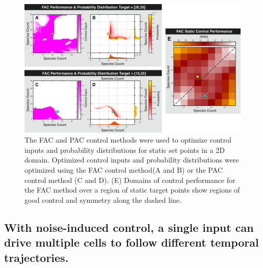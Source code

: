 \documentclass[12pt]{iopart}
\begin{document}
\begin{figure}
\begin{center}
\includegraphics[width=1\textwidth]{StaticControl.pdf}
\vspace{-0.1in}
\caption{The FAC and PAC control methods were used to optimize control inputs and probability distributions for static set points in a 2D domain.  Optimized control inputs and probability distributions were optimized using the FAC control method(A and B) or the PAC control method (C and D). (E) Domains of control performance for the FAC method over a region of static target points show regions of good control and symmetry along the dashed line.} 
\label{CtrlP}
\end{center}
\vspace{-0.2in}
\end{figure}

\subsection{With noise-induced control, a single input can drive multiple cells to follow different temporal trajectories.}\label{sec:ResTraj}
\end{document}
